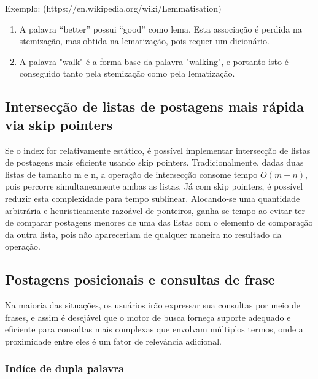 Exemplo: (https://en.wikipedia.org/wiki/Lemmatisation)

\begin{enumerate}
\item A palavra ``better'' possui ``good'' como lema. Esta associação é perdida na stemização, mas obtida na lematização, pois requer um dicionário.

\item A palavra "walk" é a forma base da palavra "walking", e portanto isto é conseguido tanto pela stemização como pela lematização.
\end{enumerate}

\subsection{Intersecção de listas de postagens mais rápida via skip pointers}

Se o index for relativamente estático, é possível implementar intersecção de listas de postagens mais eficiente usando skip pointers. Tradicionalmente, dadas duas listas de tamanho m e n, a operação de intersecção consome tempo $O(m+n)$, pois percorre simultaneamente ambas as listas. Já com skip pointers, é possível reduzir esta complexidade para tempo sublinear. Alocando-se uma quantidade arbitrária e heuristicamente razoável de ponteiros, ganha-se tempo ao evitar ter de comparar postagens menores de uma das listas com o elemento de comparação da outra lista, pois não apareceriam de qualquer maneira no resultado da operação.

\subsection{Postagens posicionais e consultas de frase}

Na maioria das situações, os usuários irão expressar sua consultas por meio de frases, e assim é desejável que o motor de busca forneça suporte adequado e eficiente para consultas mais complexas que envolvam múltiplos termos, onde a proximidade entre eles é um fator de relevância adicional.

\subsubsection{Indíce de dupla palavra}

